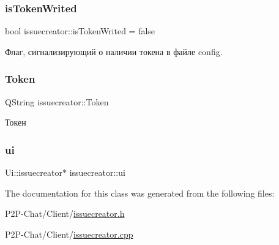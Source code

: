 \subsubsection{\texorpdfstring{is\+Token\+Writed}{isTokenWrited}}
{\footnotesize\ttfamily bool issuecreator\+::is\+Token\+Writed = false\hspace{0.3cm}{\ttfamily [private]}}



Флаг, сигнализирующий о наличии токена в файле config. 

\mbox{\label{classissuecreator_ad8f87f64c334987f0316a3d3191d55c8}} 
\subsubsection{\texorpdfstring{Token}{Token}}
{\footnotesize\ttfamily Q\+String issuecreator\+::\+Token\hspace{0.3cm}{\ttfamily [private]}}



Токен 

\mbox{\label{classissuecreator_ae85db2bae308918495f313ac058b006b}} 
\subsubsection{\texorpdfstring{ui}{ui}}
{\footnotesize\ttfamily Ui\+::issuecreator$\ast$ issuecreator\+::ui\hspace{0.3cm}{\ttfamily [private]}}



The documentation for this class was generated from the following files\+:\begin{DoxyCompactItemize}
\item 
P2\+P-\/\+Chat/\+Client/\hyperlink{issuecreator_8h}{issuecreator.\+h}\item 
P2\+P-\/\+Chat/\+Client/\hyperlink{issuecreator_8cpp}{issuecreator.\+cpp}\end{DoxyCompactItemize}
